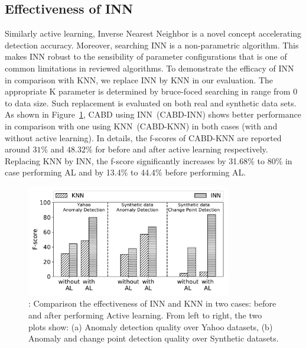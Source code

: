 



\subsection{Effectiveness of INN} 
\par Similarly active learning, Inverse Nearest Neighbor is a novel concept accelerating detection accuracy. Moreover, searching INN is a non-parametric algorithm. This makes INN robust to the sensibility of parameter configurations that is one of common limitations in reviewed algorithms. To demonstrate the efficacy of INN in comparison with KNN, we replace INN by KNN in our evaluation. The appropriate K parameter is determined by bruce-foced searching in range from 0 to data size. Such replacement is evaluated on both real and synthetic data sets. \\

As shown in Figure~\ref{fig:comapration_INNvsKNN_yahoo}, CABD using INN~(CABD-INN) shows better performance in comparison with one using KNN~(CABD-KNN) in both cases (with and without active learning). In details, the f-scores of CABD-KNN are reported around $31\%$ and $48.32\%$ for before and after active learning respectively. Replacing KNN by INN, the f-score significantly increases by 31.68\% to 80\% in case performing AL and by 13.4\% to 44.4\% before performing AL. 

\begin{figure}[h]
	\centering
	\includegraphics[width=0.8\textwidth]{Part3/Chapter7/figures/INNvsKNN_yahoo.pdf}
	\caption{ : Comparison the effectiveness of INN and KNN in two cases: before and after performing Active learning. From left to right, the two plots show: (a) Anomaly detection quality over Yahoo datasets, (b) Anomaly and change point detection quality over Synthetic datasets.}
	\label{fig:comapration_INNvsKNN_yahoo}
\end{figure}

